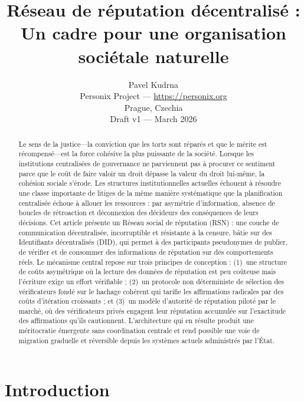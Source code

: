 \documentclass[11pt,a4paper,twocolumn]{article}
\title{\textbf{Réseau de réputation décentralisé :\\Un cadre pour une organisation sociétale naturelle}}
\author{Pavel Kudrna\\Personix Project --- \url{https://personix.org}\\Prague, Czechia\\Draft v1 --- March 2026}
\date{}
\begin{document}
\maketitle

\begin{abstract}
Le sens de la justice---la conviction que les torts sont réparés et que le mérite est récompensé---est la force cohésive la plus puissante de la société. Lorsque les institutions centralisées de gouvernance ne parviennent pas à procurer ce sentiment parce que le coût de faire valoir un droit dépasse la valeur du droit lui-même, la cohésion sociale s'érode. Les structures institutionnelles actuelles échouent à résoudre une classe importante de litiges de la même manière systématique que la planification centralisée échoue à allouer les ressources : par asymétrie d'information, absence de boucles de rétroaction et déconnexion des décideurs des conséquences de leurs décisions. Cet article présente un Réseau social de réputation (RSN) : une couche de communication décentralisée, incorruptible et résistante à la censure, bâtie sur des Identifiants décentralisés (DID), qui permet à des participants pseudonymes de publier, de vérifier et de consommer des informations de réputation sur des comportements réels. Le mécanisme central repose sur trois principes de conception : (1)~une structure de coûts asymétrique où la lecture des données de réputation est peu coûteuse mais l'écriture exige un effort vérifiable ; (2)~un protocole non déterministe de sélection des vérificateurs fondé sur le hachage cohérent qui tarifie les affirmations radicales par des coûts d'itération croissants ; et (3)~un modèle d'autorité de réputation piloté par le marché, où des vérificateurs privés engagent leur réputation accumulée sur l'exactitude des affirmations qu'ils cautionnent. L'architecture qui en résulte produit une méritocratie émergente sans coordination centrale et rend possible une voie de migration graduelle et réversible depuis les systèmes actuels administrés par l'État.
\end{abstract}

\section{Introduction}
\end{document}
